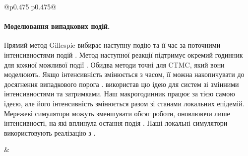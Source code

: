 \documentclass[11pt]{article}
\begin{document}
\begin{longtable}{@{}p{0.475\textwidth}|p{0.475\textwidth}@{}}
\begin{minipage}[t]{\linewidth}
\paragraph{Моделювання випадкових подій.}
Прямий метод Gillespie вибирає наступну подію та її час за поточними інтенсивностями подій \citep{gillespie1977exact}. Метод наступної реакції підтримує окремий годинник для кожної можливої події \citep{gibson2000}. Обидва методи точні для CTMC, який вони моделюють. Якщо інтенсивність змінюється з часом, її можна накопичувати до досягнення випадкового порога \citep{ethier1986}. \citet{anderson2007} використав цю ідею для систем зі змінними інтенсивностями та затримками. Наш макрогодинник працює за тією самою ідеєю, але його інтенсивність змінюється разом зі станами локальних епідемій. Мережеві симулятори можуть зменшувати обсяг роботи, оновлюючи лише інтенсивності, на які вплинула остання подія \citep{vestergaard2015,kuryliak2025simulating}. Наші локальні симулятори використовують реалізацію з \citet{kuryliak2025simulating}.
\end{minipage} &
\begin{minipage}[t]{\linewidth}

\end{minipage}
\end{longtable}
\end{document}
